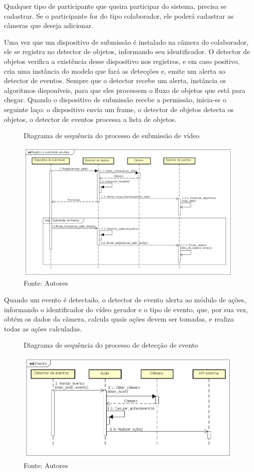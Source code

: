 \documentclass[]{politex}
\begin{document}
Qualquer tipo de participante que queira participar do sistema, precisa se cadastrar. Se o participante for do tipo colaborador, ele poderá cadastrar as câmeras que deseja adicionar.

Uma vez que um dispositivo de submissão é instalado na câmera do colaborador, ele se registra no detector de objetos, informando seu identificador. O detector de objetos verifica a existência desse dispositivo nos registros, e em caso positivo, cria uma instância do modelo que fará as detecções e, emite um alerta ao detector de eventos. Sempre que o detector recebe um alerta, instância os algoritmos disponíveis, para que eles processem o fluxo de objetos que está para chegar. Quando o dispositivo de submissão recebe a permissão, inicia-se o seguinte laço: o dispositivo envia um frame, o detector de objetos detecta os objetos, o detector de eventos processa a lista de objetos.

\begin{figure}[H]
    \centering
    \caption{Diagrama de sequência do processo de submissão de vídeo}
    \includegraphics[width=\textwidth]{Registro_e_submissao_video}
    \caption*{Fonte: Autores}
    \label{fig:registro}
\end{figure}

Quando um evento é detectado, o detector de evento alerta ao módulo de ações, informando o identificador do vídeo gerador e o tipo de evento, que, por sua vez, obtém os dados da câmera, calcula quais ações devem ser tomadas, e realiza todas as ações calculadas.

\begin{figure}[H]
    \centering
    \caption{Diagrama de sequência do processo de detecção de evento}
    \includegraphics[width=\textwidth]{Evento}
    \caption*{Fonte: Autores}
    \label{fig:evento}
\end{figure}
\end{document}
